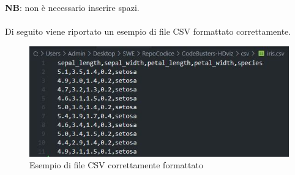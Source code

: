 \textbf{NB}: non è necessario inserire spazi.\\ \mbox{}\\

Di seguito viene riportato un esempio di file CSV formattato correttamente.

\begin{figure}[H]
		\includegraphics[scale=0.9]{Images/csv}
		\centering
		\caption{Esempio di file CSV correttamente formattato}
\end{figure}